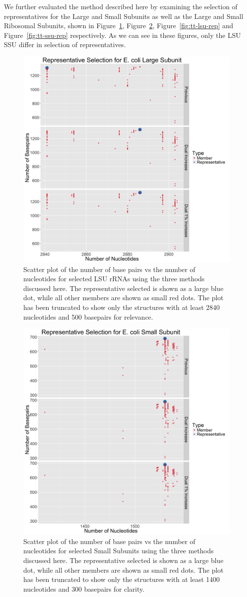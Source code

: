 We further evaluated the method described here by examining the selection of
representatives for the \EC{} Large and Small Subunits as well as the \TT{}
Large and Small Ribosomal Subunits, shown in Figure~\ref{fig:ec-lsu-rep},
Figure~\ref{fig:ec-ssu-rep}, Figure~\ref{fig:tt-lsu-rep} and
Figure~\ref{fig:tt-ssu-rep} respectively. As we can see in these figures, only
the \EC{} LSU \TT{} SSU differ in selection of representatives.

\begin{figure}
  \includegraphics[width=0.5\linewidth]{chapter-4/figs/ec-lsu-rep}
  \caption{Scatter plot of the number of base pairs vs the number of nucleotides
    for selected \EC{} LSU rRNAs using the three methods discussed here.
    The representative selected is shown as a large blue dot, while all other
    members are shown as small red dots. The plot has been truncated to show
    only the structures with at least 2840 nucleotides and 500 basepairs for
  relevance.}
  \label{fig:ec-lsu-rep}
\end{figure}

\begin{figure}
  \includegraphics[width=0.5\linewidth]{chapter-4/figs/ec-ssu-rep}
  \caption{Scatter plot of the number of base pairs vs the number of nucleotides
    for selected \EC{} Small Subunits using the three methods discussed here.
    The representative selected is shown as a large blue dot, while all other
    members are shown as small red dots. The plot has been truncated to show
    only the structures with at least 1400 nucleotides and 300 basepairs for
  clarity.}
  \label{fig:ec-ssu-rep}
\end{figure}

